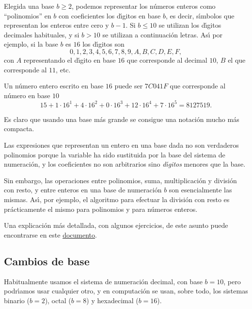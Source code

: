 Elegida una base $b\ge 2$, podemos representar los n\'umeros enteros como
``polinomios'' en $b$ con coeficientes los d\'{\i}gitos en base $b$, es decir,
s\'{\i}mbolos que representan los enteros entre cero y $b-1$. Si $b\le 10$ se
utilizan los d\'{\i}gitos decimales habituales, y si $b>10$ se utilizan a
continuaci\'on letras. As\'{\i} por ejemplo, si la base $b$ es $16$
los d\'{\i}gitos son 
\[0,1,2,3,4,5,6,7,8,9,A,B,C,D,E,F,\]
\noindent con $A$ representando el d\'{\i}gito en base $16$ que corresponde al
decimal  $10$, $B$ el que corresponde al $11$, etc.

Un n\'umero entero escrito en base $16$ puede ser $7C041F$ que corresponde al
n\'umero en base $10$
\[15+1\cdot 16^1+4\cdot 16^2+0\cdot 16^3+12\cdot 16^4+7\cdot 16^5=8127519.\]

Es claro que usando una base m\'as grande se consigue una notaci\'on mucho m\'as
compacta. 

Las expresiones que representan un entero en una base dada no son
verdaderos polinomios porque la variable ha sido sustituida por la base del
sistema de numeraci\'on,  y los coeficientes no son arbitrarios sino {\itshape
d\'{\i}gitos} menores que la base.

Sin embargo, las operaciones entre polinomios, suma, multiplicaci\'on y
divisi\'on con resto,  y entre enteros en una base de numeraci\'on $b$ son  
esencialmente las mismas. As\'{\i}, por ejemplo, el algoritmo para efectuar la
divisi\'on con resto es pr\'acticamente el mismo para polinomios y para
n\'umeros enteros. 

Una explicaci\'on m\'as detallada, con algunos ejercicios, de este asunto puede encontrarse en este
\href{http://150.244.21.37/PDFs/COMPL/StmasNumeracion.pdf}{documento}.

\subsection{Cambios de base}
Habitualmente usamos el sistema de numeraci\'on decimal, con base $b=10$, pero
podr\'{\i}amos usar cualquier otro, y en computaci\'on se usan, sobre todo, los
sistemas binario ($b=2$), octal ($b=8$) y hexadecimal ($b=16$).

